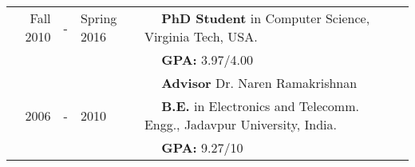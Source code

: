 
  \tabcolsep=0.11cm
  \begin{tabular}{rclll}
    Fall 2010 & - & Spring 2016 & $\quad$ {\bf PhD Student} in Computer Science, Virginia Tech, USA. \\
                & & & $\quad$ \textbf{GPA:} 3.97/4.00\\
                & & & $\quad$ \textbf{Advisor} Dr. Naren Ramakrishnan \\
    2006 & - & 2010 & $\quad$ {\bf B.E.} in Electronics and Telecomm. Engg., Jadavpur University, India. \\
        & & & $\quad$ \textbf{GPA:} 9.27/10\\
  \end{tabular}

